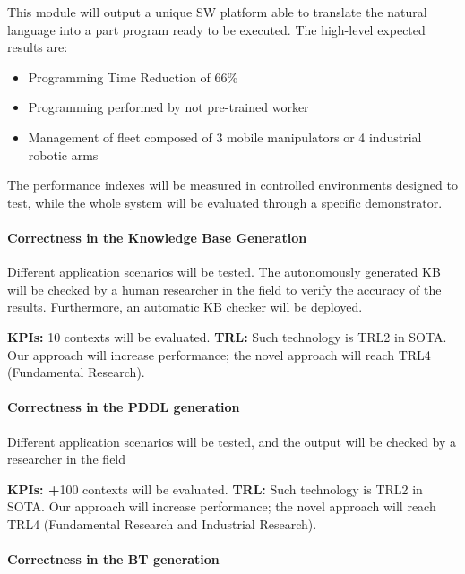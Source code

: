 This module will output a unique SW platform able to translate the
natural language into a part program ready to be executed. The
high-level expected results are:

\begin{itemize}[arrow]
\item
  Programming Time Reduction of 66\%
\item
  Programming performed by not pre-trained worker
\item
  Management of fleet composed of 3 mobile manipulators or 4 industrial
  robotic arms
\end{itemize}

The performance indexes will be measured in controlled environments
designed to test, while the whole system will be evaluated through a
specific demonstrator.

\paragraph{Correctness in the Knowledge Base
Generation}\label{correctness-in-the-knowledge-base-generation}

Different application scenarios will be tested. The autonomously
generated KB will be checked by a human researcher in the field to
verify the accuracy of the results. Furthermore, an automatic KB checker
will be deployed.

\textbf{KPIs:} 10 contexts will be evaluated. \textbf{\textbar{} TRL:}
Such technology is TRL2 in SOTA. Our approach will increase performance;
the novel approach will reach TRL4 (Fundamental Research).

\paragraph{Correctness in the PDDL
generation}\label{correctness-in-the-pddl-generation}

Different application scenarios will be tested, and the output will be
checked by a researcher in the field

\textbf{KPIs: +}100 contexts will be evaluated. \textbf{\textbar{} TRL:}
Such technology is TRL2 in SOTA. Our approach will increase performance;
the novel approach will reach TRL4 (Fundamental Research and Industrial
Research).

\paragraph{Correctness in the BT
generation}\label{correctness-in-the-bt-generation}

